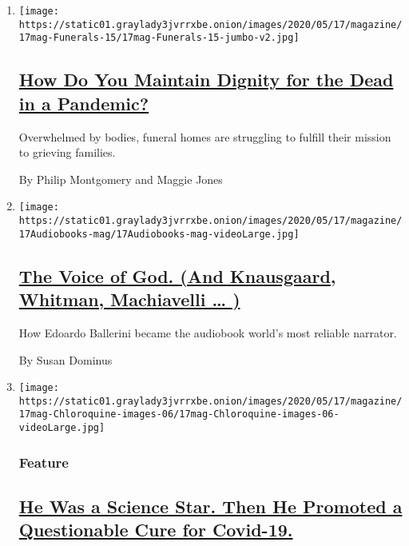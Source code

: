 \begin{enumerate}
\def\labelenumi{\arabic{enumi}.}
\item
  \texttt{[image: https://static01.graylady3jvrrxbe.onion/images/2020/05/17/magazine/17mag-Funerals-15/17mag-Funerals-15-jumbo-v2.jpg]}

  \hypertarget{how-do-you-maintain-dignity-for-the-dead-in-a-pandemic}{%
  \subsection{\texorpdfstring{\href{/2020/05/14/magazine/funeral-home-covid.html}{How
  Do You Maintain Dignity for the Dead in a
  Pandemic?}}{How Do You Maintain Dignity for the Dead in a Pandemic?}}\label{how-do-you-maintain-dignity-for-the-dead-in-a-pandemic}}

  Overwhelmed by bodies, funeral homes are struggling to fulfill their
  mission to grieving families.

  By Philip Montgomery and Maggie Jones
\item
  \texttt{[image: https://static01.graylady3jvrrxbe.onion/images/2020/05/17/magazine/17Audiobooks-mag/17Audiobooks-mag-videoLarge.jpg]}

  \hypertarget{the-voice-of-god-and-knausgaard-whitman-machiavelli--}{%
  \subsection{\texorpdfstring{\href{/interactive/2020/05/13/magazine/audiobooks-edoardo-ballerini.html}{The
  Voice of God. (And Knausgaard, Whitman, Machiavelli \ldots{}
  )}}{The Voice of God. (And Knausgaard, Whitman, Machiavelli \ldots{} )}}\label{the-voice-of-god-and-knausgaard-whitman-machiavelli--}}

  How Edoardo Ballerini became the audiobook world's most reliable
  narrator.

  By Susan Dominus
\item
  \texttt{[image: https://static01.graylady3jvrrxbe.onion/images/2020/05/17/magazine/17mag-Chloroquine-images-06/17mag-Chloroquine-images-06-videoLarge.jpg]}

  \hypertarget{feature}{%
  \subsubsection{Feature}\label{feature}}

  \hypertarget{he-was-a-science-star-then-he-promoted-a-questionable-cure-for-covid-19}{%
  \subsection{\texorpdfstring{\href{/2020/05/12/magazine/didier-raoult-hydroxychloroquine.html}{He
  Was a Science Star. Then He Promoted a Questionable Cure for
  Covid-19.}}{He Was a Science Star. Then He Promoted a Questionable Cure for Covid-19.}}\label{he-was-a-science-star-then-he-promoted-a-questionable-cure-for-covid-19}}


\end{enumerate}
